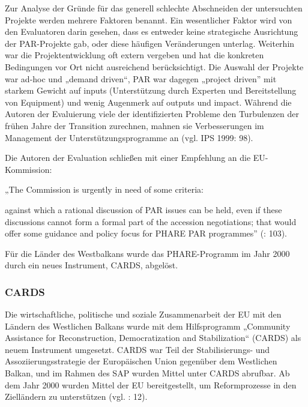 Zur Analyse der Gründe für das generell schlechte Abschneiden der untersuchten Projekte werden mehrere Faktoren benannt. Ein wesentlicher Faktor wird von den Evaluatoren darin gesehen, dass es entweder keine strategische Ausrichtung der PAR-Projekte gab, oder diese häufigen Veränderungen unterlag. Weiterhin war die Projektentwicklung oft extern vergeben und hat die konkreten Bedingungen vor Ort nicht ausreichend berücksichtigt. Die Auswahl der Projekte war ad-hoc und „demand driven“, PAR war dagegen „project driven” mit starkem Gewicht auf inputs (Unterstützung durch Experten und Bereitstellung von Equipment) und wenig Augenmerk auf outputs und impact. Während die Autoren der Evaluierung viele der identifizierten Probleme den Turbulenzen der frühen Jahre der Transition zurechnen, mahnen sie Verbesserungen im Management der Unterstützungsprogramme an (vgl. IPS 1999: 98).

Die Autoren der Evaluation schließen mit einer Empfehlung an die EU-Kommission: 

„The Commission is urgently in need of some criteria:

against which a rational discussion of PAR issues can be held, even if these discussions cannot form a formal part of the accession negotiations;
that would offer some guidance and policy focus for PHARE PAR programmes” (\cite{ips}: 103).\par
Für die Länder des Westbalkans wurde das PHARE-Programm im Jahr 2000 durch ein neues Instrument, CARDS, abgelöst.


\subsubsection{CARDS} 

Die wirtschaftliche, politische und soziale Zusammenarbeit der EU mit den Ländern des Westlichen Balkans wurde mit dem Hilfsprogramm „Community Assistance for Reconstruction, Democratization and Stabilization“ (CARDS) als neuem Instrument umgesetzt. CARDS war Teil der Stabilisierungs- und Assoziierungsstrategie der Europäischen Union gegenüber dem Westlichen Balkan, und im Rahmen des SAP wurden Mittel unter CARDS abrufbar. Ab dem Jahr 2000 wurden Mittel der EU bereitgestellt, um Reformprozesse in den Zielländern zu unterstützen (vgl. \cite{calic01}: 12).\par

